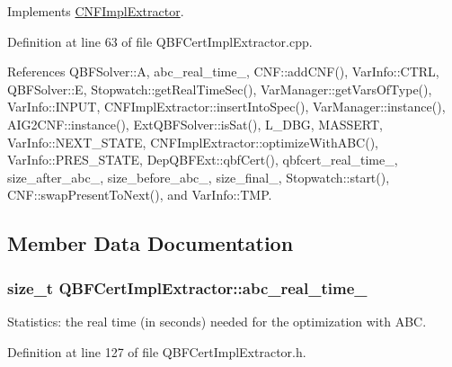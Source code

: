 Implements \hyperlink{classCNFImplExtractor_a8251ce58869f9f8ded159f1fa07ab334}{C\-N\-F\-Impl\-Extractor}.



Definition at line 63 of file Q\-B\-F\-Cert\-Impl\-Extractor.\-cpp.



References Q\-B\-F\-Solver\-::\-A, abc\-\_\-real\-\_\-time\-\_\-, C\-N\-F\-::add\-C\-N\-F(), Var\-Info\-::\-C\-T\-R\-L, Q\-B\-F\-Solver\-::\-E, Stopwatch\-::get\-Real\-Time\-Sec(), Var\-Manager\-::get\-Vars\-Of\-Type(), Var\-Info\-::\-I\-N\-P\-U\-T, C\-N\-F\-Impl\-Extractor\-::insert\-Into\-Spec(), Var\-Manager\-::instance(), A\-I\-G2\-C\-N\-F\-::instance(), Ext\-Q\-B\-F\-Solver\-::is\-Sat(), L\-\_\-\-D\-B\-G, M\-A\-S\-S\-E\-R\-T, Var\-Info\-::\-N\-E\-X\-T\-\_\-\-S\-T\-A\-T\-E, C\-N\-F\-Impl\-Extractor\-::optimize\-With\-A\-B\-C(), Var\-Info\-::\-P\-R\-E\-S\-\_\-\-S\-T\-A\-T\-E, Dep\-Q\-B\-F\-Ext\-::qbf\-Cert(), qbfcert\-\_\-real\-\_\-time\-\_\-, size\-\_\-after\-\_\-abc\-\_\-, size\-\_\-before\-\_\-abc\-\_\-, size\-\_\-final\-\_\-, Stopwatch\-::start(), C\-N\-F\-::swap\-Present\-To\-Next(), and Var\-Info\-::\-T\-M\-P.



\subsection{Member Data Documentation}
\hypertarget{classQBFCertImplExtractor_a90be758f6fb963647db3aa9c384075d8}{
\subsubsection[{abc\-\_\-real\-\_\-time\-\_\-}]{\setlength{\rightskip}{0pt plus 5cm}size\-\_\-t Q\-B\-F\-Cert\-Impl\-Extractor\-::abc\-\_\-real\-\_\-time\-\_\-\hspace{0.3cm}{\ttfamily [protected]}}}\label{classQBFCertImplExtractor_a90be758f6fb963647db3aa9c384075d8}


Statistics\-: the real time (in seconds) needed for the optimization with A\-B\-C. 



Definition at line 127 of file Q\-B\-F\-Cert\-Impl\-Extractor.\-h.



